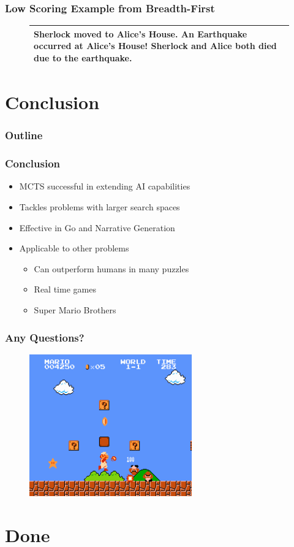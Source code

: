 \documentclass{beamer}
\begin{document}
\begin{frame}[fragile]
\frametitle{Low Scoring Example from Breadth-First}
\begin{figure}[h]
\begin{tabular}{|p{10cm}|}
\hline
Sherlock moved to Alice's House. An Earthquake occurred at Alice's House! Sherlock and Alice both died due to the earthquake. \\ \hline
\end{tabular}
\centering
\label{fig:BadStory}
\end{figure}
\end{frame}

\section{Conclusion}

\begin{frame}
\frametitle{Outline}
\tableofcontents[currentsection]
\end{frame}

\begin{frame}
\frametitle{Conclusion}
\begin{itemize}
	\item MCTS successful in extending AI capabilities
	\item Tackles problems with larger search spaces
	\item Effective in Go and Narrative Generation
	\item Applicable to other problems
	\begin{itemize}
		\item Can outperform humans in many puzzles
		\item Real time games
		\item Super Mario Brothers
	\end{itemize}
\end{itemize}
\end{frame}

\begin{frame}[fragile]
\frametitle{Any Questions?}
\begin{figure}[h]
	\includegraphics[width=7cm]{Diagrams/NESSuperMarioBros.png}
	\centering
\end{figure}
\end{frame}

\section{Done}
 
\end{document}
